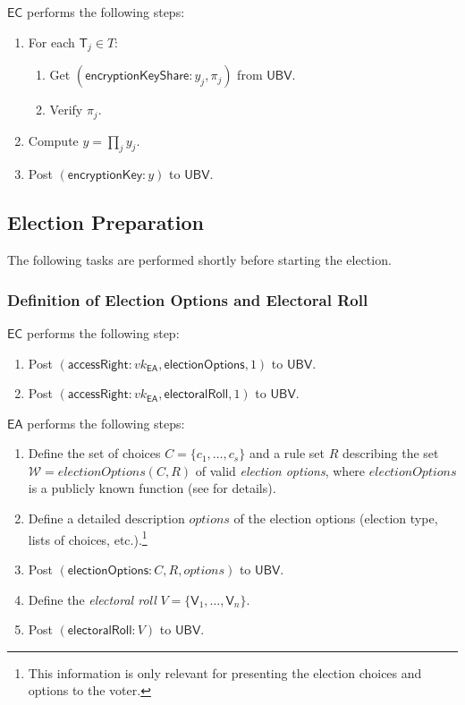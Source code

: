 \documentclass[bibtotoc,halfparskip,oneside]{scrreprt}
\newcommand{\descrOptions}{\mathit{options}\xspace}
\newcommand{\vk}[1]{\mathit{vk}_{#1}\xspace}
\newcommand{\EA}{\ensuremath{\mathsf{EA}}\xspace}
\newcommand{\EC}{\ensuremath{\mathsf{EC}}\xspace}
\newcommand{\UBV}{\ensuremath{\mathsf{UBV}}\xspace}
\newcommand{\Tallier}[1]{\ensuremath{\mathsf{T}_{#1}}\xspace}
\newcommand{\Voter}[1]{\ensuremath{\mathsf{V}_{#1}}\xspace}
\begin{document}
	\EC performs the following steps:
	\begin{enumerate}[resume]
		\item For each $\Tallier{j}\in T$:
		\begin{enumerate}
			\item Get $(\mathsf{encryptionKeyShare}:y_j,\pi_{j})$ from \UBV.
			\item Verify $\pi_{j}$.
		\end{enumerate}
		\item Compute $y=\prod_j y_j$.
		\item Post $(\mathsf{encryptionKey}:y)$ to \UBV.
	\end{enumerate}
	
	
	\subsection{Election Preparation}\label{preparation}
	
	The following tasks are performed shortly before starting the election.
	
	\subsubsection{Definition of Election Options and Electoral Roll}
	
	\EC performs the following step:
	\begin{enumerate}
		\item Post $(\mathsf{accessRight}: \vk{\EA}, \mathsf{electionOptions}, 1)$ to \UBV.
		\item Post $(\mathsf{accessRight}: \vk{\EA}, \mathsf{electoralRoll}, 1)$ to \UBV.
	\end{enumerate}
	
	\EA performs the following steps:
	\begin{enumerate}[resume]
		\item Define the set of choices $C=\{c_1,\ldots,c_s\}$ and a rule set $R$ describing the set $\mathcal{W}=\mathit{electionOptions}(C,R)$ of valid \emph{election options}, where $\mathit{electionOptions}$ is a publicly known function (see  for details).
		\item Define a detailed description $\descrOptions$ of the election options (election type, lists of choices, etc.).\footnote{This information is only relevant for presenting the election choices and options to the voter.}
		\item Post $(\mathsf{electionOptions}:C,R,\descrOptions)$ to \UBV.
		\item Define the \emph{electoral roll} $V=\{\Voter{1},\ldots,\Voter{n}\}$.
		\item Post $(\mathsf{electoralRoll}:V)$ to \UBV.
	\end{enumerate}
	
\end{document}
